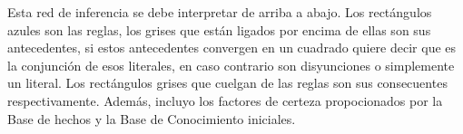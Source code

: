 \begin{center}
\end{center}

\break

\par Esta red de inferencia se debe interpretar de arriba a abajo.
Los rectángulos azules son las reglas, los grises que están ligados por encima 
de ellas son sus antecedentes, si estos antecedentes convergen en un cuadrado 
quiere decir que es la conjunción de esos literales, en caso contrario son disyunciones
o simplemente un literal. Los rectángulos grises que cuelgan de las reglas 
son sus consecuentes respectivamente. Además, incluyo los factores de certeza propocionados por
la Base de hechos y la Base de Conocimiento iniciales.
